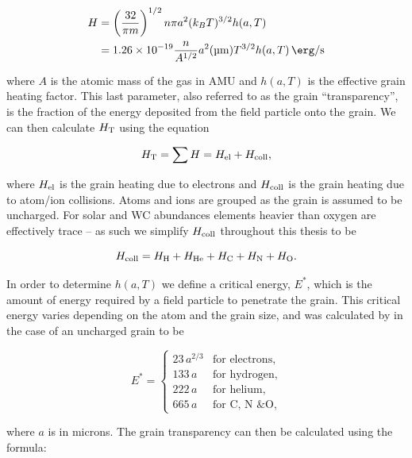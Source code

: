\begin{equation}
  \begin{split}
    H & = \left(\frac{32}{\pi m}\right)^{1/2} n\pi a^2 (k_B T)^{3/2} h(a,T) \\
    & = \num{1.26e-19} \frac{n}{A^{1/2}} a^2 (\si{\micro\metre}) T^{3/2} h(a,T) \, \si{\erg\per\second}
  \end{split}
\end{equation}

\noindent
where $A$ is the atomic mass of the gas in AMU and $h(a,T)$ is the effective grain heating factor.
This last parameter, also referred to as the grain ``transparency'', is the fraction of the energy deposited from the field particle onto the grain.
We can then calculate $H_\text{T}$ using the equation

\begin{equation}
  \label{eq:calchcolltotal}
  H_\text{T} = \sum H = H_\text{el} + H_\text{coll},
\end{equation}

\noindent
where $H_\text{el}$ is the grain heating due to electrons and $H_\text{coll}$ is the grain heating due to atom/ion collisions.
Atoms and ions are grouped as the grain is assumed to be uncharged.
For solar and WC abundances elements heavier than oxygen are effectively trace -- as such we simplify $H_\text{coll}$ throughout this thesis to be

\begin{equation}
  H_\text{coll} = H_\text{H} + H_\text{He} + H_\text{C} + H_\text{N} + H_\text{O} . 
\end{equation}

\noindent
In order to determine $h(a,T)$ we define a critical energy, $E^*$, which is the amount of energy required by a field particle to penetrate the grain. 
This critical energy varies depending on the atom and the grain size, and was calculated by \textcite{dwek_infrared_1981} in the case of an uncharged grain to be

\begin{equation}
  E^* =
  \begin{cases}
    23  \, a^{2/3} & \text{for electrons} , \\
    133 \, a & \text{for hydrogen} , \\
    222 \, a & \text{for helium} , \\
    665 \, a & \text{for C, N \& O} ,
  \end{cases}
\end{equation}

\noindent
where $a$ is in microns.
The grain transparency can then be calculated using the formula:

